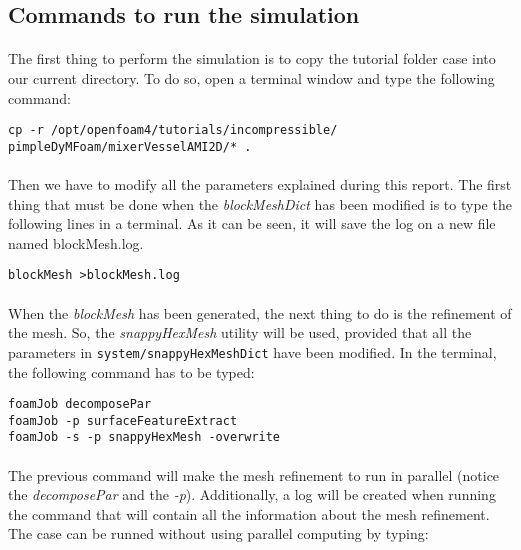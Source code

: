 \subsection{Commands to run the simulation}
\paragraph{}The first thing to perform the simulation is to copy the tutorial folder case into our current directory. To do so, open a terminal window and type the following command:

\begin{center}
\texttt{cp -r /opt/openfoam4/tutorials/incompressible/\\ pimpleDyMFoam/mixerVesselAMI2D/* .
}
\end{center}
\paragraph{}Then we have to modify all the parameters explained during this report. The first thing that must be done when the \textit{blockMeshDict} has been modified is to type the following lines in a terminal. As it can be seen, it will save the log on a new file named blockMesh.log.

\begin{center}
\texttt{blockMesh >blockMesh.log}
\end{center}

\paragraph{}When the \textit{blockMesh} has been generated, the next thing to do is the refinement of the mesh. So, the \textit{snappyHexMesh} utility will be used, provided that all the parameters in \texttt{system/snappyHexMeshDict} have been modified. In the terminal, the following command has to be typed:

\begin{center}
\texttt{foamJob decomposePar \\
foamJob -p surfaceFeatureExtract \\
foamJob -s -p snappyHexMesh -overwrite}
\end{center}

\paragraph{}The previous command will make the mesh refinement to run in parallel (notice the \textit{decomposePar} and the \textit{-p}). Additionally, a log will be created when running the command that will contain all the information about the mesh refinement. The case can be runned without using parallel computing by typing:

